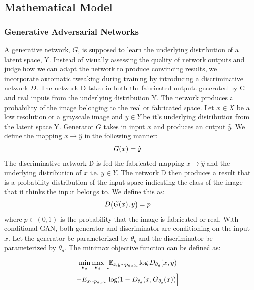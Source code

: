 \documentclass[10pt,twocolumn,letterpaper]{article}
\begin{document}
    \subsection{Mathematical Model}
    \subsubsection{Generative Adversarial Networks}
     A generative network, $G$, is supposed to learn the underlying distribution of a latent space, Y. Instead of visually assessing the quality of network outputs and judge how we can adapt the network to produce convincing results, we incorporate automatic tweaking during training by introducing a discriminative network $D$. The network D takes in both the fabricated outputs generated by G and real inputs from the underlying distribution Y. The network produces a probability of the image belonging to the real or fabricated space.
     Let $x \in X$ be a low resolution or a grayscale image and $y \in Y$ be it's underlying distribution from the latent space Y. Generator $G$ takes in input $x$ and produces an output $\hat{y}$. We define the mapping $x \rightarrow \hat{y}$ in the following manner:
      \begin{equation}
          \footnotesize{G(x) = \hat{y}}
      \end{equation}
     The discriminative network D is fed the fabricated mapping $x \rightarrow \hat{y}$ and the underlying distribution of $x$ i.e. $y \in Y$. The network D then produces a result that is a probability distribution of the input space indicating the class of the image that it thinks the input belongs to. We define this as:
     \begin{equation}
         \footnotesize{D\big(G(x),y\big) = p}
     \end{equation}
     where $p \in (0,1)$ is the probability that the image is fabricated or real.
    With conditional GAN, both generator and discriminator are conditioning on the input $x$. Let the generator be parameterized by $\theta_g$ and the discriminator be parameterized by $\theta_d$. The minimax objective function can be defined as:
    \begin{multline}
    \min_{\theta_g}\max_{\theta_d}\Big[\mathbb{E}_{x,y\sim p_{\tiny{data}}} \log D_{\theta_d}(x,y) \\+ E_{{x\sim p_{\tiny{data}}}} \log(1 - D_{\theta_d}(x, G_{\theta_g}(x))\Big]
        \normalsize
    \end{multline}
    
\end{document}
